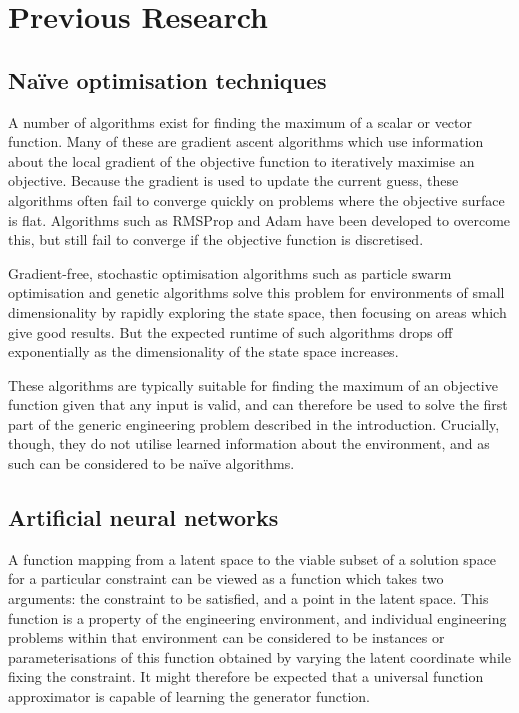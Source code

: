 \documentclass[../../main.tex]{subfiles}
\begin{document}
\chapter{Previous Research} \label{chapter:previousResearch}

\section{Na\"{i}ve optimisation techniques} \label{section:naiveOptimisationTechniques}

A number of algorithms exist for finding the maximum of a scalar or vector function.
Many of these are gradient ascent algorithms \cite{ruder17} which use information about the local gradient of the objective function to iteratively maximise an objective.
Because the gradient is used to update the current guess, these algorithms often fail to converge quickly on problems where the objective surface is flat.
Algorithms such as RMSProp \cite{hinton17} and Adam \cite{kingma17} have been developed to overcome this, but still fail to converge if the objective function is discretised.

Gradient-free, stochastic optimisation algorithms such as particle swarm optimisation \cite{kennedy12} and genetic algorithms \cite{carr14} solve this problem for environments of small dimensionality by rapidly exploring the state space, then focusing on areas which give good results.
But the expected runtime of such algorithms drops off exponentially as the dimensionality of the state space increases.

These algorithms are typically suitable for finding the maximum of an objective function given that any input is valid, and can therefore be used to solve the first part of the generic engineering problem described in the introduction.
Crucially, though, they do not utilise learned information about the environment, and as such can be considered to be na\"{i}ve algorithms.

\section{Artificial neural networks} \label{section:artificialNeuralNetworks}

A function mapping from a latent space to the viable subset of a solution space for a particular constraint can be viewed as a function which takes two arguments: the constraint to be satisfied, and a point in the latent space.
This function is a property of the engineering environment, and individual engineering problems within that environment can be considered to be instances or parameterisations of this function obtained by varying the latent coordinate while fixing the constraint.
It might therefore be expected that a universal function approximator is capable of learning the generator function.
\end{document}

